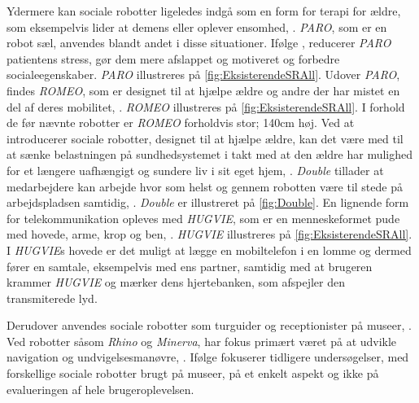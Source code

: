 Ydermere kan sociale robotter ligeledes indgå som en form for terapi for ældre, som eksempelvis lider at demens eller oplever ensomhed, \parencite[s. 110]{PDF:TheMobilePhoneAnEmontionalisedSR}. \textit{PARO}, som er en robot sæl, anvendes blandt andet i disse situationer. Ifølge \textcite{WEB:PARO}, reducerer \textit{PARO} patientens stress, gør dem mere afslappet og motiveret og forbedre socialeegenskaber. \textit{PARO} illustreres på \autoref{fig:EksisterendeSRAll}. Udover \textit{PARO}, findes \textit{ROMEO}, som er designet til at hjælpe ældre og andre der har mistet en del af deres mobilitet, \parencite{WEB:ROMEO}. \textit{ROMEO} illustreres på \autoref{fig:EksisterendeSRAll}. I forhold de før nævnte robotter er \textit{ROMEO} forholdvis stor; 140cm høj. Ved at introducerer sociale robotter, designet til at hjælpe ældre, kan det være med til at sænke belastningen på sundhedsystemet i takt med at den ældre har mulighed for et længere uafhængigt og sundere liv i sit eget hjem, \parencite[s. 1]{PDF:SharingALifeHarvey}.\blankline
% 
\textit{Double} tillader at medarbejdere kan arbejde hvor som helst og gennem robotten være til stede på arbejdspladsen samtidig, \parencite{WEB:Double}. \textit{Double} er illustreret på \autoref{fig:Double}. En lignende form for telekommunikation opleves med \textit{HUGVIE}, som er en menneskeformet pude med hovede, arme, krop og ben, \parencite[s. 78]{PDF:MinimizingTheHuman}. \textit{HUGVIE} illustreres på \autoref{fig:EksisterendeSRAll}. I \textit{HUGVIE}s hovede er det muligt at lægge en mobiltelefon i en lomme og dermed fører en samtale, eksempelvis med ens partner, samtidig med at brugeren krammer \textit{HUGVIE} og mærker dens hjertebanken, som afspejler den transmiterede lyd.

Derudover anvendes sociale robotter som turguider og receptionister på museer, \parencite[s. 22]{PDF:CloseButNotStuck}. Ved robotter såsom \textit{Rhino} og \textit{Minerva}, har fokus primært været på at udvikle navigation og undvigelsesmanøvre, \parencite[s. 318]{PDF:VisitingCulturalHeritage}. Ifølge \textcite[ss. 318-319]{PDF:VisitingCulturalHeritage} fokuserer tidligere undersøgelser, med forskellige sociale robotter brugt på museer, på et enkelt aspekt og ikke på evalueringen af hele brugeroplevelsen.     

